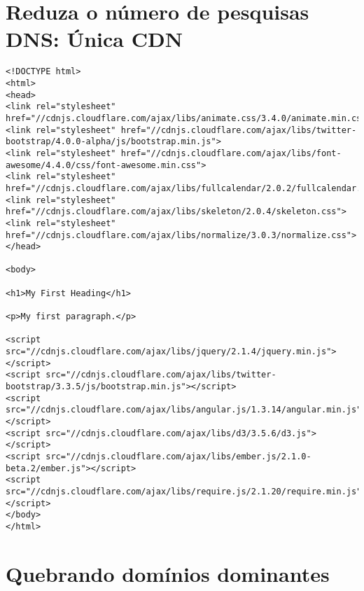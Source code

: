 \begin{apendicesenv}
\begin{lstlisting}
\end{lstlisting}

\chapter{Reduza o número de pesquisas DNS: Única CDN}
\label{apend:codigo_reduzaonumerodepesquisasdns_unic}	

\begin{lstlisting}
<!DOCTYPE html>
<html>
<head>
<link rel="stylesheet" href="//cdnjs.cloudflare.com/ajax/libs/animate.css/3.4.0/animate.min.css">
<link rel="stylesheet" href="//cdnjs.cloudflare.com/ajax/libs/twitter-bootstrap/4.0.0-alpha/js/bootstrap.min.js">
<link rel="stylesheet" href="//cdnjs.cloudflare.com/ajax/libs/font-awesome/4.4.0/css/font-awesome.min.css">	
<link rel="stylesheet" href="//cdnjs.cloudflare.com/ajax/libs/fullcalendar/2.0.2/fullcalendar.js">
<link rel="stylesheet" href="//cdnjs.cloudflare.com/ajax/libs/skeleton/2.0.4/skeleton.css">
<link rel="stylesheet" href="//cdnjs.cloudflare.com/ajax/libs/normalize/3.0.3/normalize.css">
</head>

<body>

<h1>My First Heading</h1>

<p>My first paragraph.</p>

<script src="//cdnjs.cloudflare.com/ajax/libs/jquery/2.1.4/jquery.min.js"></script>
<script src="//cdnjs.cloudflare.com/ajax/libs/twitter-bootstrap/3.3.5/js/bootstrap.min.js"></script>
<script src="//cdnjs.cloudflare.com/ajax/libs/angular.js/1.3.14/angular.min.js"></script>
<script src="//cdnjs.cloudflare.com/ajax/libs/d3/3.5.6/d3.js"></script>
<script src="//cdnjs.cloudflare.com/ajax/libs/ember.js/2.1.0-beta.2/ember.js"></script>
<script src="//cdnjs.cloudflare.com/ajax/libs/require.js/2.1.20/require.min.js"></script>	
</body>
</html>

\end{lstlisting}

\chapter{Quebrando domínios dominantes}
\label{apend:quebrandodominiodominantes}

\begin{lstlisting}

\end{lstlisting}

\end{apendicesenv}
